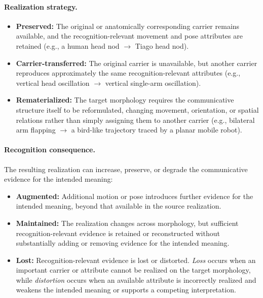 \documentclass[letterpaper,10pt,conference]{ieeeconf}
\begin{document}
\paragraph{Realization strategy.}
\begin{itemize}
\item \textbf{Preserved:} The original or anatomically corresponding carrier remains available, and the recognition-relevant movement and pose attributes are retained (e.g., a human head nod $\rightarrow$ Tiago head nod).

\item \textbf{Carrier-transferred:} The original carrier is unavailable, but another carrier reproduces approximately the same recognition-relevant attributes (e.g., vertical head oscillation $\rightarrow$ vertical single-arm oscillation).

\item \textbf{Rematerialized:} The target morphology requires the communicative structure itself to be reformulated, changing movement, orientation, or spatial relations rather than simply assigning them to another carrier (e.g., bilateral arm flapping $\rightarrow$ a bird-like trajectory traced by a planar mobile robot).

\end{itemize}

\paragraph{Recognition consequence.}
The resulting realization can increase, preserve, or degrade the communicative evidence for the intended meaning:
\begin{itemize}
\item \textbf{Augmented:} Additional motion or pose introduces further evidence for the intended meaning, beyond that available in the source realization.

\item \textbf{Maintained:} The realization changes across morphology, but sufficient recognition-relevant evidence is retained or reconstructed without substantially adding or removing evidence for the intended meaning.

\item \textbf{Lost:} Recognition-relevant evidence is lost or distorted. \emph{Loss} occurs when an important carrier or attribute cannot be realized on the target morphology, while \emph{distortion} occurs when an available attribute is incorrectly realized and weakens the intended meaning or supports a competing interpretation.

\end{itemize}
\end{document}
